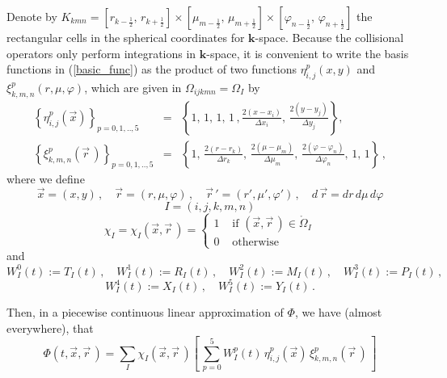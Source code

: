 \documentclass[11pt]{article}
\newcommand{\bk}{\mathbf{k}}
\newcommand{\ot}{\frac{1}{2}}
\begin{document}
Denote by 
$
 K_{kmn} = \left[ r_{k - \ot} , \, r_{k + \ot} \right] \times
           \left[ \mu_{m - \ot} , \, \mu_{m + \ot} \right] \times
           \left[ \varphi_{n - \ot} , \, \varphi_{n + \ot} \right]
$ the rectangular cells in the spherical coordinates for $\bk$-space.
Because the collisional operators only perform integrations in $\bk$-space, it is convenient to write the basis functions in (\ref{basic_func})
as the product of two functions $\eta^{p}_{i,j}(x,y)$ and $\xi^{p}_{k,m,n}(r,\mu,\varphi)$, which 
are given in $\Omega_{ijkmn} = \Omega_{I}$ by
\begin{eqnarray}
\left\lbrace \eta^{p}_{i,j}(\vec{x}) \right\rbrace_{p=0,1,..,5} & = &
\left\lbrace 
1 , \, 1 , \, 1 , \, 1 \, ,
\frac{2(x - x_{i})}{\Delta x_{i}} , \, \frac{2(y - y_{j})}{\Delta y_{j}}
\right\rbrace ,
\\[10pt]
\left\lbrace \xi^{p}_{k,m,n}(\vec{r}\,) \right\rbrace_{p=0,1,..,5} & = &
\left\lbrace 
1 , \, \frac{2(r - r_{k})}{\Delta r_{k}} , \, \frac{2(\mu - \mu_{m})}{\Delta \mu_{m}} ,
\, \frac{2(\varphi - \varphi_{n})}{\Delta \varphi_{n}} , \, 1 , \, 1
\right\rbrace \, ,
\end{eqnarray}
where we define
\begin{equation}
\vec{x} = (x,y) \, , \quad \vec{r} = (r,\mu, \varphi) \, , \quad  \vec{r} \, ' = (r',\mu', \varphi') \, , \quad  d\,\vec{r} = dr\,d\mu\,d\varphi
\end{equation}
\begin{equation}
 I  =  (i,j,k,m,n)
\end{equation}
\begin{equation} \label{eq:chiI}
\chi_{I} = \chi_{I} ( \vec{x},\vec{r} \, ) =  \left\lbrace 
\begin{array}{ll}
1 & \mbox{ if } (\vec{x},\vec{r}\,) \in \mathring{\Omega}_{I}  \\
0 & \mbox{ otherwise}
\end{array}
\right. 
\end{equation}
and 
\begin{equation}
 W_{I}^0(t) := T_{I}(t) \, , \quad W_{I}^1(t) := R_{I}(t) \, , \quad W_{I}^2(t) := M_{I}(t) \, , \quad  W_{I}^3(t) := P_{I}(t) \, , 
\end{equation} 
\begin{equation} \label{eq:WpI}
W_{I}^4(t) := X_{I}(t) \, , \quad W_{I}^5(t) := Y_{I}(t) \, . 
\end{equation}


Then, in a piecewise continuous linear approximation of $\Phi$, we have (almost everywhere), that
\begin{equation}
\Phi(t,\vec{x},\vec{r}\,) =
\sum_{I} \chi_{I} ( \vec{x},\vec{r} \, )  %
\left[ \, 
\sum_{p=0}^{5} W_{I}^p(t) \, \eta^{p}_{i,j}(\vec{x}) \, \xi^{p}_{k,m,n}(\vec{r} \, ) 
\, \right]
\label{Phi_W}
\end{equation}
\end{document}
